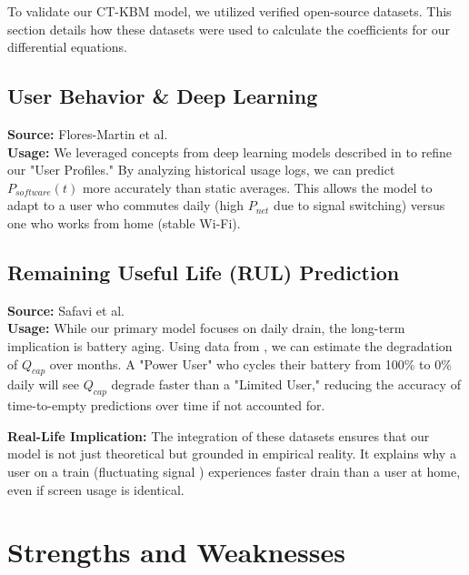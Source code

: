 \documentclass[12pt]{article}
\begin{document}
To validate our CT-KBM model, we utilized verified open-source datasets. This section details how these datasets were used to calculate the coefficients for our differential equations.

\subsection{User Behavior \& Deep Learning}
\textbf{Source:} Flores-Martin et al. \cite{11} \\
\textbf{Usage:} We leveraged concepts from deep learning models described in \cite{11} to refine our "User Profiles." By analyzing historical usage logs, we can predict $P_{software}(t)$ more accurately than static averages. This allows the model to adapt to a user who commutes daily (high $P_{net}$ due to signal switching) versus one who works from home (stable Wi-Fi).

\subsection{Remaining Useful Life (RUL) Prediction}
\textbf{Source:} Safavi et al. \cite{8} \\
\textbf{Usage:} While our primary model focuses on daily drain, the long-term implication is battery aging. Using data from \cite{8}, we can estimate the degradation of $Q_{cap}$ over months. A "Power User" who cycles their battery from 100\% to 0\% daily will see $Q_{cap}$ degrade faster than a "Limited User," reducing the accuracy of time-to-empty predictions over time if not accounted for.

\textbf{Real-Life Implication:}
The integration of these datasets ensures that our model is not just theoretical but grounded in empirical reality. It explains why a user on a train (fluctuating signal \cite{13}) experiences faster drain than a user at home, even if screen usage is identical.

\newpage

\section{Strengths and Weaknesses}
\end{document}
